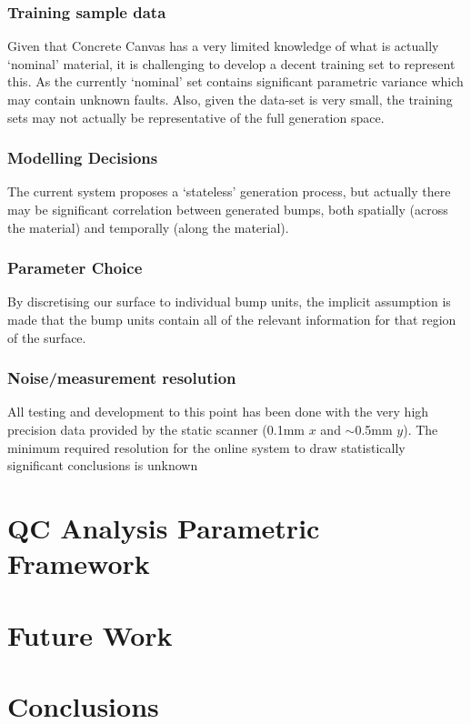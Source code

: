 \documentclass[12pt]{report}
\begin{document}
        \subsection{Training sample data}
            Given that Concrete Canvas has a very limited knowledge of what is actually `nominal' material, it is challenging to develop a decent training set to represent this. As the currently `nominal' set contains significant parametric variance which may contain unknown faults.
            Also, given the data-set is very small, the training sets may not actually be representative of the full generation space.
        \subsection{Modelling Decisions}
            The current system proposes a `stateless' generation process, but actually there may be significant correlation between generated bumps, both spatially (across the material) and temporally (along the material). 
        \subsection{Parameter Choice}
            By discretising our surface to individual bump units, the implicit assumption is made that the bump units contain all of the relevant information for that region of the surface.
        \subsection{Noise/measurement resolution}
            All testing and development to this point has been done with the very high precision data provided by the static scanner (0.1mm $x$ and $\sim$0.5mm $y$). The minimum required resolution for the online system to draw statistically significant conclusions is unknown
            
\chapter{QC Analysis Parametric Framework}
\chapter{Future Work}
\chapter{Conclusions}



\end{document}
